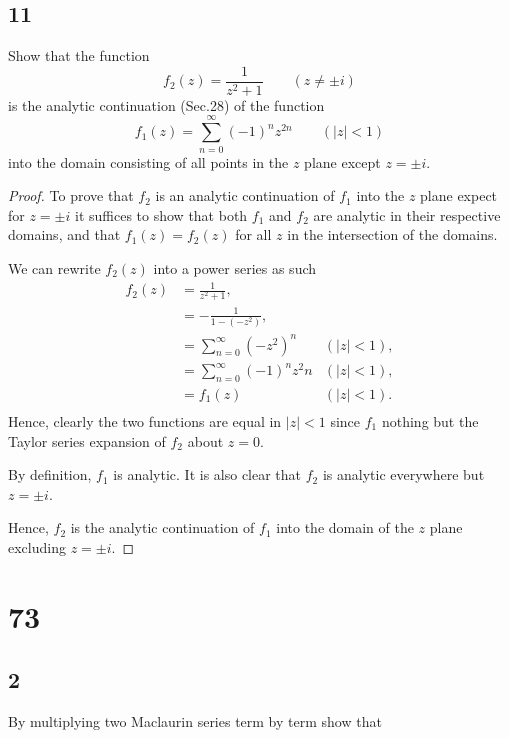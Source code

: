 \documentclass{article}
\begin{document}
\subsection*{11}
Show that the function
\[f_2(z) = \frac{1}{z^2 + 1} \qquad (z \neq \pm i)\]
is the analytic continuation (Sec.28) of the function
\[f_1(z) = \sum_{n=0}^\infty(-1)^nz^{2n}\qquad (|z| < 1)\]
into the domain consisting of all points in the $z$ plane except $z = \pm i$.

\begin{proof}
    To prove that $f_2$ is an analytic continuation of $f_1$ into the $z$ plane
    expect for $z = \pm i$ it suffices to show that both $f_1$ and $f_2$ are
    analytic in their respective domains, and that $f_1(z) = f_2(z)$ for all
    $z$ in the intersection of the domains.

    We can rewrite $f_2(z)$ into a power series as such
    \begin{align*}
        f_2(z) & = \frac{1}{z^2 + 1},                         \\
               & = -\frac{1}{1 - (-z^2)},                     \\
               & = \sum_{n=0}^\infty (-z^2)^n    & (|z| < 1), \\
               & = \sum_{n=0}^\infty (-1)^n z^2n & (|z| < 1), \\
               & = f_1(z)                        & (|z| < 1). \\
    \end{align*}
    Hence, clearly the two functions are equal in $|z| < 1$ since $f_1$
    nothing but the Taylor series expansion of $f_2$ about $z=0$.

    By definition, $f_1$ is analytic. It is also clear that $f_2$ is analytic
    everywhere but $z = \pm i$.

    Hence, $f_2$ is the analytic continuation of $f_1$ into the domain of
    the $z$ plane excluding $z = \pm i$.
\end{proof}

\section*{73}
\subsection*{2}
By multiplying two Maclaurin series term by term show that
\end{document}
